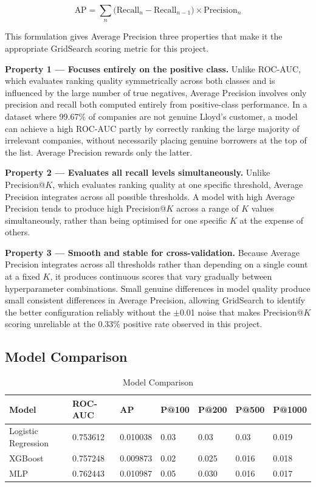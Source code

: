 \documentclass[ %
                    author={Natchalin Iwsakul \\[0.4em] Inkaphol Siriwongwattana \\[0.4em] Tanaphan Kummaraphat \\[0.6em] Patorn Srisupap},,
                supervisor={Fernando Moreno-Pino},
                    degree={MSc},
                     title={Propensity Modelling for SME Commercial Lending Using Open Public Data
},
                  subtitle={Companies House and GDELT as predictors of first-time borrowing},
                      type={},
                      year={2026}]{dissertation}
\begin{document}
\begin{equation}
    \text{AP} =
    \sum_{n} \bigl(\text{Recall}_{n} - \text{Recall}_{n-1}
    \bigr) \times \text{Precision}_{n}
    \label{eq:ap_gridsearch}
\end{equation}

\noindent
This formulation gives Average Precision three properties
that make it the appropriate GridSearch scoring metric for
this project.

\textbf{Property 1 --- Focuses entirely on the positive
class.}
Unlike ROC-AUC, which evaluates ranking quality
symmetrically across both classes and is influenced by the
large number of true negatives, Average Precision involves
only precision and recall both computed entirely from
positive-class performance. In a dataset where 99.67\% of
companies are not genuine Lloyd's customer, a
model can achieve a high ROC-AUC partly by correctly
ranking the large majority of irrelevant companies, without
necessarily placing genuine borrowers at the top of the
list. Average Precision rewards only the latter.

\textbf{Property 2 --- Evaluates all recall levels
simultaneously.}
Unlike Precision@$K$, which evaluates ranking quality at
one specific threshold, Average Precision integrates
across all possible thresholds. A model with high Average
Precision tends to produce high Precision@$K$ across a
range of $K$ values simultaneously, rather than being
optimised for one specific $K$ at the expense of others.

\textbf{Property 3 --- Smooth and stable for
cross-validation.}
Because Average Precision integrates across all thresholds
rather than depending on a single count at a fixed $K$,
it produces continuous scores that vary gradually between
hyperparameter combinations. Small genuine differences in
model quality produce small consistent differences in
Average Precision, allowing GridSearch to identify the
better configuration reliably without the $\pm$0.01
noise that makes Precision@$K$ scoring unreliable at the
0.33\% positive rate observed in this project.


\subsection{Model Comparison}

\begin{table}[h]
    \centering
    \begin{tabular}{lllllll}
    \toprule
        Model & ROC-AUC & AP & P@100 & P@200 & P@500 & P@1000 \\
        \midrule
         Logistic Regression & 0.753612 & 0.010038 & 0.03 & 0.03 & 0.03 & 0.019 \\
         XGBoost & 0.757248 & 0.009873 & 0.02 & 0.025 & 0.016 & 0.018 \\
         MLP & 0.762443 & 0.010987 & 0.05 & 0.030 & 0.016 & 0.017 \\
         \bottomrule
    \end{tabular}
    \caption{Model Comparison}
    \label{tab:modelcompare}
\end{table}
\end{document}
